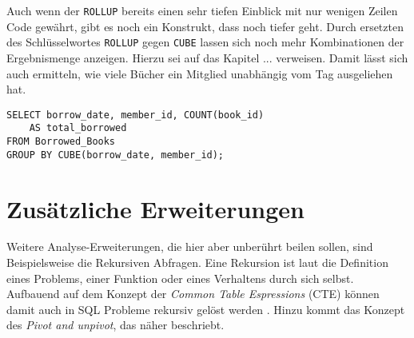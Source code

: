 Auch wenn der \texttt{ROLLUP} bereits einen sehr tiefen Einblick mit nur wenigen
Zeilen Code gewährt, gibt es noch ein Konstrukt, dass noch tiefer geht. Durch ersetzten
des Schlüsselwortes \texttt{ROLLUP} gegen \texttt{CUBE} lassen sich noch mehr Kombinationen
der Ergebnismenge anzeigen. Hierzu sei auf das Kapitel ... verweisen. Damit lässt
sich auch ermitteln, wie viele Bücher ein Mitglied unabhängig vom Tag
ausgeliehen hat.

\begin{lstlisting}
SELECT borrow_date, member_id, COUNT(book_id)
	AS total_borrowed
FROM Borrowed_Books
GROUP BY CUBE(borrow_date, member_id);
\end{lstlisting}

\section{Zusätzliche Erweiterungen}
\label{sec:zus_erweiterungen} Weitere Analyse-Erweiterungen, die hier aber
unberührt beilen sollen, sind Beispielsweise die Rekursiven Abfragen. Eine
Rekursion ist laut \citet{benecke1998rekursion} die Definition eines Problems,
einer Funktion oder eines Verhaltens durch sich selbst. Aufbauend auf dem Konzept
der \textit{Common Table Espressions} (CTE) können damit auch in SQL Probleme
rekursiv gelöst werden \citep{Ignacio2022}. Hinzu kommt das Konzept des \textit{Pivot
and unpivot}, das \citet{Nuijten2023} näher beschriebt.